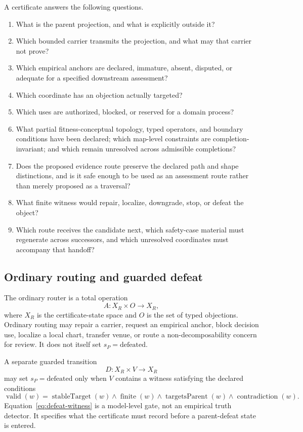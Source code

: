 \documentclass[11pt]{article}
\begin{document}
A certificate answers the following questions.
\begin{enumerate}[label=(\arabic*)]
\item What is the parent projection, and what is explicitly outside it?
\item Which bounded carrier transmits the projection, and what may that carrier not prove?
\item Which empirical anchors are declared, immature, absent, disputed, or adequate for a specified downstream assessment?
\item Which coordinate has an objection actually targeted?
\item Which uses are authorized, blocked, or reserved for a domain process?
\item What partial fitness-conceptual topology, typed operators, and boundary conditions have been declared; which map-level constraints are completion-invariant; and which remain unresolved across admissible completions?
\item Does the proposed evidence route preserve the declared path and shape distinctions, and is it safe enough to be used as an assessment route rather than merely proposed as a traversal?
\item What finite witness would repair, localize, downgrade, stop, or defeat the object?
\item Which route receives the candidate next, which safety-case material must regenerate across successors, and which unresolved coordinates must accompany that handoff?
\end{enumerate}

\subsection{Ordinary routing and guarded defeat}

The ordinary router is a total operation
\begin{equation}
A:X_R\times O\longrightarrow X_R,
\end{equation}
where $X_R$ is the certificate-state space and $O$ is the set of typed objections. Ordinary routing may repair a carrier, request an empirical anchor, block decision use, localize a local chart, transfer venue, or route a non-decomposability concern for review. It does not itself set $s_P=\mathrm{defeated}$.

A separate guarded transition
\begin{equation}
D:X_R\times V\longrightarrow X_R
\end{equation}
may set $s_P=\mathrm{defeated}$ only when $V$ contains a witness satisfying the declared conditions
\begin{equation}
\operatorname{valid}(w)=\operatorname{stableTarget}(w)\wedge\operatorname{finite}(w)\wedge\operatorname{targetsParent}(w)\wedge\operatorname{contradiction}(w).
\label{eq:defeat-witness}
\end{equation}
Equation~\eqref{eq:defeat-witness} is a model-level gate, not an empirical truth detector. It specifies what the certificate must record before a parent-defeat state is entered.
\end{document}

